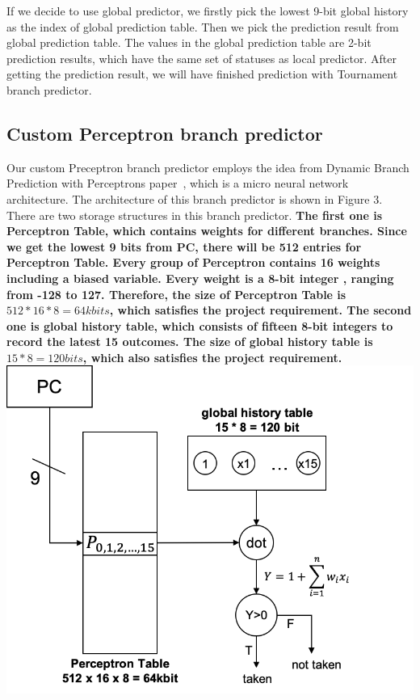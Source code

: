\documentclass[conference]{IEEEtran}
\begin{document}
If we decide to use global predictor, we firstly pick the lowest 9-bit global history as the index of global prediction table. Then we pick the prediction result from global prediction table. 
The values in the global prediction table are 2-bit prediction results, which have the same set of statuses as local predictor. After getting the prediction result, we will have finished prediction with Tournament branch predictor. 
\subsection{Custom Perceptron branch predictor}
Our custom Preceptron branch predictor employs the idea from Dynamic Branch Prediction with Perceptrons paper~\cite{nicepaper4}, which is a micro neural network architecture. The architecture of this branch predictor is shown in Figure 3.
There are two storage structures in this branch predictor. \textbf{The first one is Perceptron Table, which contains weights for different branches. Since we get the lowest 9 bits from PC, there will be 512 entries for Perceptron Table. 
Every group of Perceptron contains 16 weights including a biased variable. Every weight is a 8-bit integer , ranging from -128 to 127. Therefore, the size of Perceptron Table is $512*16*8 = 64k  bits$, which satisfies the project requirement. 
The second one is global history table, which consists of fifteen 8-bit integers to record the latest 15 outcomes. The size of global history table is $15*8 = 120  bits$, which also 
satisfies the project requirement.}
\includegraphics[width=\linewidth]{perceptron.png}
\end{document}
